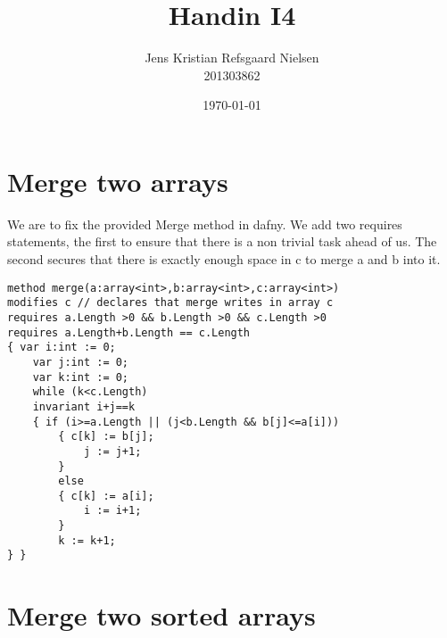 \documentclass{article}
\title{Handin I4}
\author{Jens Kristian Refsgaard Nielsen\\201303862}
\date{\today}
\theoremstyle{remark}
\begin{document}
\maketitle
\section{Merge two arrays}
We are to fix the provided Merge method in dafny. We add two requires statements, the first to ensure that there is a non trivial task ahead of us. The second secures that there is exactly enough space in c to merge a and b into it. 
\begin{lstlisting}
method merge(a:array<int>,b:array<int>,c:array<int>)
modifies c // declares that merge writes in array c
requires a.Length >0 && b.Length >0 && c.Length >0
requires a.Length+b.Length == c.Length
{ var i:int := 0;
	var j:int := 0;
	var k:int := 0;
	while (k<c.Length)
	invariant i+j==k
	{ if (i>=a.Length || (j<b.Length && b[j]<=a[i]))
		{ c[k] := b[j];
			j := j+1;
		}
		else
		{ c[k] := a[i];
			i := i+1;
		}
		k := k+1;
} }
\end{lstlisting}
\newpage
\section{Merge two sorted arrays}
\end{document}
